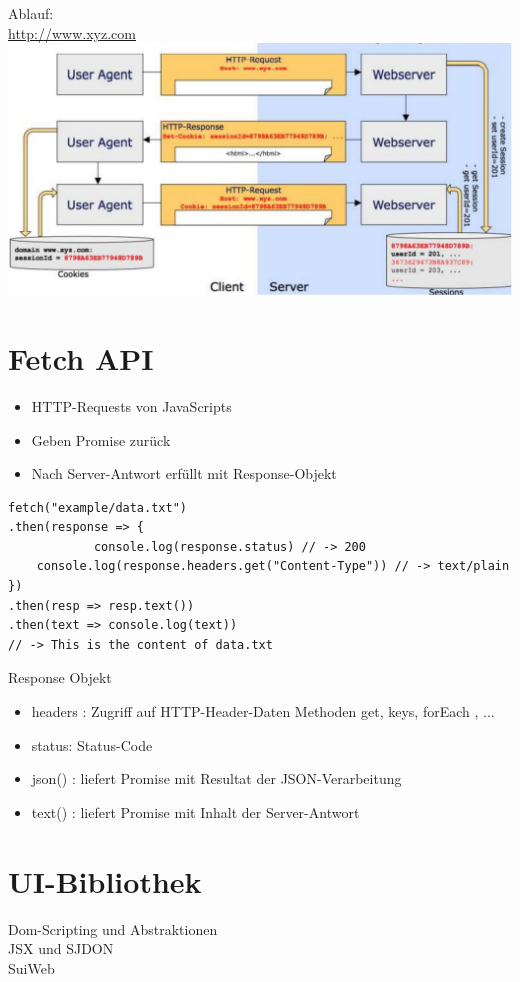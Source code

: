 \documentclass[10pt]{article}
\begin{document}
Ablauf:\\
\href{http://www.xyz.com}{http://www.xyz.com}\\
\includegraphics[width=\linewidth]{images/2024_12_29_858f09cde51177c71657g-31(1)}

\section*{Fetch API}
\begin{itemize}
  \item HTTP-Requests von JavaScripts
  \item Geben Promise zurück
  \item Nach Server-Antwort erfüllt mit Response-Objekt
\end{itemize}

\begin{verbatim}
fetch("example/data.txt")
.then(response => {
            console.log(response.status) // -> 200
    console.log(response.headers.get("Content-Type")) // -> text/plain
})
.then(resp => resp.text())
.then(text => console.log(text))
// -> This is the content of data.txt
\end{verbatim}

Response Objekt

\begin{itemize}
  \item headers : Zugriff auf HTTP-Header-Daten Methoden get, keys, forEach , ...
  \item status: Status-Code
  \item json() : liefert Promise mit Resultat der JSON-Verarbeitung
  \item text() : liefert Promise mit Inhalt der Server-Antwort
\end{itemize}

\section*{UI-Bibliothek}
Dom-Scripting und Abstraktionen\\
JSX und SJDON\\
SuiWeb
\end{document}
